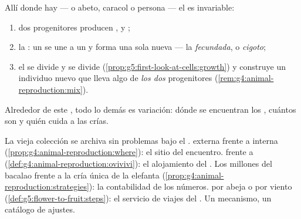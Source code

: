 \begin{proposition}\label{prop:g8:sexual-reproduction:core}
Allí donde hay  ---  o abeto, caracol o persona
--- el  es invariable:
\begin{enumerate}
  \item dos progenitores producen ,  y ;
  \item la \emph{}: un   se une a un 
         y forma una sola  nueva --- la \emph{
         fecundada}, o \emph{cigoto};
  \item el  se divide y se divide
        (\cref{prop:g5:first-look-at-cells:growth}) y construye un
        individuo nuevo que lleva algo de \emph{los dos} progenitores
        (\cref{rem:g4:animal-reproduction:mix}).
\end{enumerate}
Alrededor de este , todo lo demás es variación: dónde se
encuentran los , cuántos son y quién cuida a las crías.
\end{proposition}
\admitted

\begin{example}\label{ex:g8:sexual-reproduction:variations}
La vieja colección se archiva sin problemas bajo el . 
externa frente a interna
(\cref{prop:g4:animal-reproduction:where}): el sitio del encuentro.
 frente a 
(\cref{def:g4:animal-reproduction:ovivivi}): el alojamiento del .
Los millones del bacalao frente a la cría única de la elefanta
(\cref{prop:g4:animal-reproduction:strategies}): la contabilidad de los
números.  por abeja o por viento
(\cref{def:g5:flower-to-fruit:steps}): el servicio de viajes del 
. Un mecanismo, un catálogo de ajustes.
\end{example}

